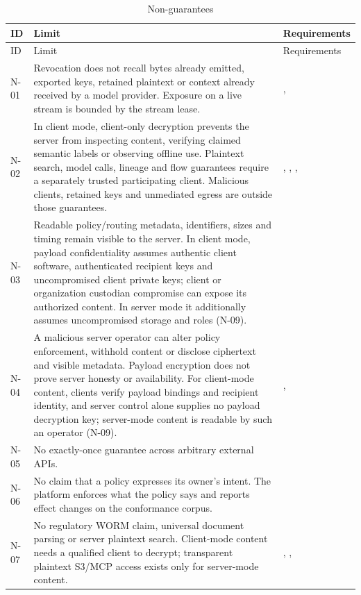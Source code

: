 \begin{longtable}{@{}P{0.07\textwidth}P{0.55\textwidth}P{0.27\textwidth}@{}}
\caption{Non-guarantees}\label{tab:nonguarantees}\\
\toprule ID & Limit & Requirements\\\midrule\endfirsthead
\toprule ID & Limit & Requirements\\\midrule\endhead
N-01 & Revocation does not recall bytes already emitted, exported keys, retained plaintext or context already received by a model provider. Exposure on a live stream is bounded by the stream lease. & , \\
N-02 & In client mode, client-only decryption prevents the server from inspecting content, verifying claimed semantic labels or observing offline use. Plaintext search, model calls, lineage and flow guarantees require a separately trusted participating client. Malicious clients, retained keys and unmediated egress are outside those guarantees. & , , , \\
N-03 & Readable policy/routing metadata, identifiers, sizes and timing remain visible to the server. In client mode, payload confidentiality assumes authentic client software, authenticated recipient keys and uncompromised client private keys; client or organization custodian compromise can expose its authorized content. In server mode it additionally assumes uncompromised storage and  roles (N-09). & \\
N-04 & A malicious server operator can alter policy enforcement, withhold content or disclose ciphertext and visible metadata. Payload encryption does not prove server honesty or availability. For client-mode content, clients verify payload bindings and recipient identity, and server control alone supplies no payload decryption key; server-mode content is readable by such an operator (N-09). & , \\
N-05 & No exactly-once guarantee across arbitrary external APIs. & \\
N-06 & No claim that a policy expresses its owner's intent. The platform enforces what the policy says and reports effect changes on the conformance corpus. & \\
N-07 & No regulatory WORM claim, universal document parsing or server plaintext search. Client-mode content needs a qualified client to decrypt; transparent plaintext S3/MCP access exists only for server-mode content. & , , \\

\end{longtable}
